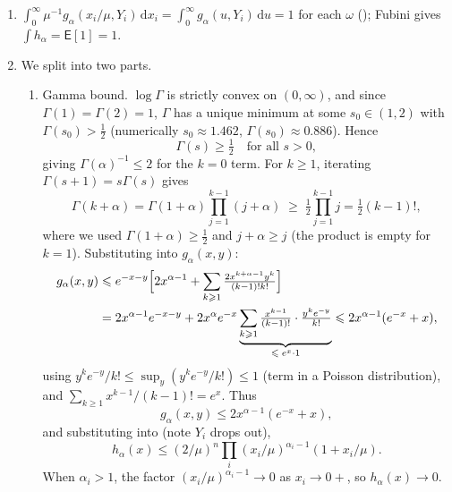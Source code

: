 \documentclass[12pt,a4paper]{article}
\makeatletter
\theoremstyle{definition}
\renewenvironment{proof}[1][\proofname]{\par
  \pushQED{\qed}%
  \normalfont \topsep6\p@\@plus6\p@\relax
  \trivlist
  \item[\hskip\labelsep\bfseries #1\@addpunct{.}]\ignorespaces
}{%
  \popQED\endtrivlist\@endpefalse
}
\newcommand{\EE}{\mathsf{E}}
\newcommand{\dd}{\mathrm{d}}
\makeatother
\begin{document}
\begin{proof}
  \leavevmode
  \begin{enumerate}[label=(\roman*)]
    \item $\int_0^\infty\mu^{-1}g_\alpha(x_i/\mu,Y_i)\,\dd x_i
      =\int_0^\infty g_\alpha(u,Y_i)\,\dd u=1$ for each $\omega$
      (); Fubini gives
      $\int h_\alpha=\EE[1]=1$.

    \item We split into two parts.
      \begin{enumerate}
        \item Gamma bound.  $\log\Gamma$ is strictly convex on
          $(0,\infty)$, and since $\Gamma(1)=\Gamma(2)=1$, $\Gamma$ has
          a unique minimum at some $s_0\in(1,2)$ with $\Gamma(s_0)>\tfrac12$
          (numerically $s_0\approx 1.462$, $\Gamma(s_0)\approx 0.886$).
          Hence
          \begin{equation}\label{eq:gamma_lb}
            \Gamma(s)\geqslant\tfrac12\quad\text{for all }s>0,
          \end{equation}
          giving $\Gamma(\alpha)^{-1}\leqslant 2$ for the $k=0$ term.
          For $k\geqslant 1$, iterating $\Gamma(s+1)=s\Gamma(s)$ gives
          \[
            \Gamma(k+\alpha)
            =\Gamma(1+\alpha)\prod_{j=1}^{k-1}(j+\alpha)
            \;\geqslant\;\tfrac12\prod_{j=1}^{k-1}j
            =\tfrac12(k-1)!,
          \]
          where we used $\Gamma(1+\alpha)\geqslant\tfrac12$ and
          $j+\alpha\geqslant j$ (the product is empty for $k=1$).
          Substituting into
          $g_\alpha(x,y)$:
          \begin{align*}
            g_\alpha(x,y)
            &\leqslant e^{-x-y}\Bigl[2x^{\alpha-1}
              +\sum_{k\geqslant 1}\tfrac{2x^{k+\alpha-1}y^k}{(k-1)!k!}\Bigr]\\
            &=2x^{\alpha-1}e^{-x-y}
              +2x^\alpha e^{-x}\underbrace{\sum_{k\geqslant 1}\tfrac{x^{k-1}}{(k-1)!}
              \cdot\tfrac{y^ke^{-y}}{k!}}_{\leqslant\;e^x\cdot 1}
            \leqslant 2x^{\alpha-1}(e^{-x}+x),
          \end{align*}
          using $y^ke^{-y}/k!\leqslant\sup_y(y^ke^{-y}/k!)\leqslant 1$
          (term in a Poisson distribution), and
          $\sum_{k\geqslant 1}x^{k-1}/(k-1)!=e^x$.  Thus
          \begin{equation}\label{eq:gbound}
            g_\alpha(x,y)\leqslant 2x^{\alpha-1}(e^{-x}+x),
          \end{equation}
          and substituting into  (note $Y_i$ drops out),
          \begin{equation}\label{eq:hbound}
            h_\alpha(x)\leqslant(2/\mu)^n\prod_{i}(x_i/\mu)^{\alpha_i-1}(1+x_i/\mu).
          \end{equation}
          When $\alpha_i>1$, the factor $(x_i/\mu)^{\alpha_i-1}\to 0$
          as $x_i\to 0+$, so $h_\alpha(x)\to 0$.


\end{enumerate}
\end{enumerate}
\end{proof}
\end{document}
